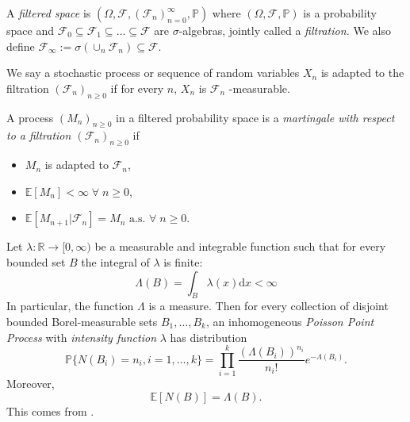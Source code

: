 \begin{definition}
    A \emph{filtered space} is $(\Omega,\mathcal{F},(\mathcal{F}_n)_{n=0}^\infty,\mathbb{P})$
    where $(\Omega,\mathcal{F},\mathbb{P})$ is a probability space and 
    $\mathcal{F}_0\subseteq\mathcal{F}_1\subseteq\dots\subseteq\mathcal{F}$
    are $\sigma$-algebras, jointly called a \emph{filtration.} We also define
    $\mathcal{F}_\infty:=\sigma(\cup_n\mathcal{F}_n)\subseteq\mathcal{F}.$ 
    
    We say a stochastic process or sequence of random variables $X_n$ is adapted to
    the filtration $(\mathcal{F}_n)_{n\geq0}$ if for every $n$, $X_n$ is $\mathcal{F}_n$
    -measurable. 
\end{definition}

\begin{definition}[Martingales]
    A process $(M_n)_{n\geq0}$ in a filtered probability space is a
    \emph{martingale with respect to a filtration $(\mathcal{F}_n)_{n\geq0}$}
    if
    \begin{itemize}
        \item $M_n$ is adapted to $\mathcal{F}_n$,
        \item $\mathbb{E}[M_n]<\infty\;\forall\;n\geq0$,
        \item $\mathbb{E}[M_{n+1}|\mathcal{F}_n]=M_n\textrm{ a.s. }\forall\;n\geq0.$
    \end{itemize}
\end{definition}

\begin{definition}
    Let $\lambda:\mathbb{R}\rightarrow[0,\infty)$ be a measurable and
    integrable function such that for every bounded set $B$ the integral of 
    $\lambda$ is finite:
    \begin{equation}
        \Lambda(B)=\int_B\lambda(x)\mathrm dx<\infty
    \end{equation}
    In particular, the function $\Lambda$ is a measure.
    Then for every collection of disjoint bounded Borel-measurable sets
    $B_1,\dots,B_k$, an inhomogeneous \emph{Poisson Point Process} with
    \emph{intensity function} $\lambda$ has distribution
    \begin{equation}
        \mathbb{P}\{N(B_i)=n_i,i=1,\dots,k\}=\prod_{i=1}^k\frac{(\Lambda(B_i))^{n_i}}{n_i!}e^{-\Lambda(B_i)}.
    \end{equation}
    Moreover,
    \begin{equation}
        \mathbb{E}[N(B)]=\Lambda(B).
    \end{equation}
    This comes from \cite{PointTheory}.
\end{definition}

